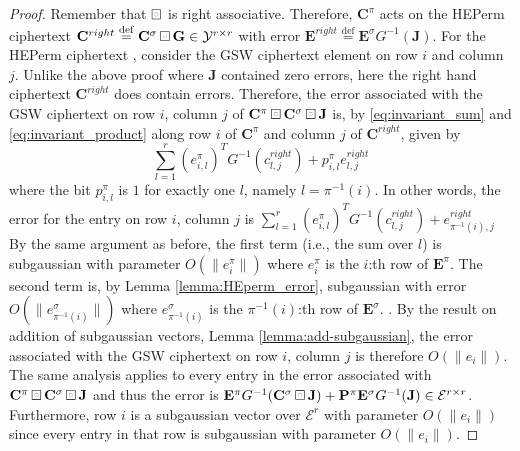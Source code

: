 \begin{proof}
    Remember that $\boxring$ is right associative. Therefore, $\mathbf{C}^\pi$ acts on the HEPerm ciphertext $\mathbf{C}^{right} \stackrel{\mathrm{def}}{=} \mathbf{C}^\sigma \boxring \mathbf{G} \in \mathcal{Y}^{r \times r}$ with error $\mathbf{E}^{right} \stackrel{\mathrm{def}}{=} \mathbf{E}^{\sigma} G^{-1}(\mathbf{J})$. For the HEPerm ciphertext , consider the GSW ciphertext element on row $i$ and column $j$. Unlike the above proof where $\mathbf{J}$ contained zero errors, here the right hand ciphertext $\mathbf{C}^{right}$ does contain errors. Therefore, the error associated with the GSW ciphertext on row $i$, column $j$ of $\mathbf{C}^{\pi} \boxring \mathbf{C}^{\sigma} \boxring \mathbf{J}$ is, by \ref{eq:invariant_sum} and \ref{eq:invariant_product} along row $i$ of $\mathbf{C}^{\pi}$ and column $j$ of $\mathbf{C}^{right}$, given by
    \begin{equation*}
        \sum\limits_{l=1}^r (e_{i,l}^{\pi})^T G^{-1}(c^{right}_{l,j}) + p^{\pi}_{i,l}e^{right}_{l,j}
    \end{equation*}
    where the bit $p^{\pi}_{i,l}$ is $1$ for exactly one $l$, namely $l = \pi^{-1}(i)$. In other words, the error for the entry on row $i$, column $j$ is $\sum\limits_{l=1}^r (e_{i,l}^{\pi})^T G^{-1}(c^{right}_{l,j}) + e^{right}_{\pi^{-1}(i),j}$ By the same argument as before, the first term (i.e., the sum over $l$) is subgaussian with parameter $O(\|e^{\pi}_i\|)$ where $e^{\pi}_i$ is the $i$:th row of $\mathbf{E}^{\pi}$. The second term is, by Lemma \ref{lemma:HEperm_error}, subgaussian with error $O(\|e^{\sigma}_{\pi^{-1}(i)}\|)$ where $e^{\sigma}_{\pi^{-1}(i)}$ is the $\pi^{-1}(i)$:th row of $\mathbf{E}^\sigma$. . By the result on addition of subgaussian vectors, Lemma \ref{lemma:add-subgaussian}, the error associated with the GSW ciphertext on row $i$, column $j$ is therefore $O(\|e_i\|)$. The same analysis applies to every entry in the error associated with $\mathbf{C}^{\pi} \boxring \mathbf{C}^{\sigma} \boxring \mathbf{J}$ and thus the error is $\mathbf{E}^{\pi} G^{-1}(\mathbf{C}^\sigma \boxring \mathbf{J}) + \mathbf{P}^{\pi} \mathbf{E}^{\sigma}G^{-1}(\mathbf{J}) \in \mathcal{E}^{r \times r}$. Furthermore, row $i$ is a subgaussian vector over $\mathcal{E}^r$ with parameter $O(\|e_i\|)$ since every entry in that row is subgaussian with parameter $O(\|e_i\|)$. 
\end{proof}

